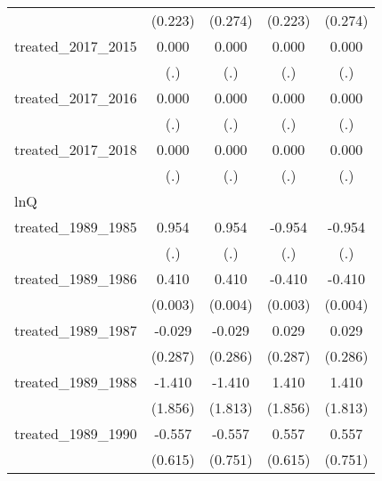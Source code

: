 {\begin{tabular}{l*{4}{c}}
            &     (0.223)         &     (0.274)         &     (0.223)         &     (0.274)         \\
[1em]
treated\_2017\_2015&       0.000         &       0.000         &       0.000         &       0.000         \\
            &         (.)         &         (.)         &         (.)         &         (.)         \\
[1em]
treated\_2017\_2016&       0.000         &       0.000         &       0.000         &       0.000         \\
            &         (.)         &         (.)         &         (.)         &         (.)         \\
[1em]
treated\_2017\_2018&       0.000         &       0.000         &       0.000         &       0.000         \\
            &         (.)         &         (.)         &         (.)         &         (.)         \\
\hline
lnQ         &                     &                     &                     &                     \\
treated\_1989\_1985&       0.954         &       0.954         &      -0.954         &      -0.954         \\
            &         (.)         &         (.)         &         (.)         &         (.)         \\
[1em]
treated\_1989\_1986&       0.410\sym{***}&       0.410\sym{***}&      -0.410\sym{***}&      -0.410\sym{***}\\
            &     (0.003)         &     (0.004)         &     (0.003)         &     (0.004)         \\
[1em]
treated\_1989\_1987&      -0.029         &      -0.029         &       0.029         &       0.029         \\
            &     (0.287)         &     (0.286)         &     (0.287)         &     (0.286)         \\
[1em]
treated\_1989\_1988&      -1.410         &      -1.410         &       1.410         &       1.410         \\
            &     (1.856)         &     (1.813)         &     (1.856)         &     (1.813)         \\
[1em]
treated\_1989\_1990&      -0.557         &      -0.557         &       0.557         &       0.557         \\
            &     (0.615)         &     (0.751)         &     (0.615)         &     (0.751)         \\

\end{tabular}}
